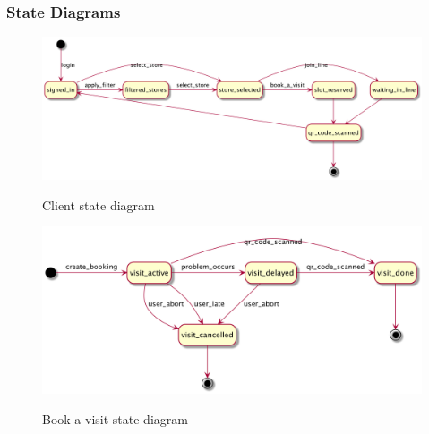 \subsubsection{State Diagrams}
\begin{figure}[H]
    \centering
    \includegraphics[width=1\textwidth]{uml/client_state_chart.png}
    \label{fig:client_state_diag}
    \caption{Client state diagram}
\end{figure}

\begin{figure}[H]
    \centering
    \includegraphics[width=1\textwidth]{uml/visit_state_diagram.png}
    \label{fig:visit_state_diag}
    \caption{Book a visit state diagram}
\end{figure}


